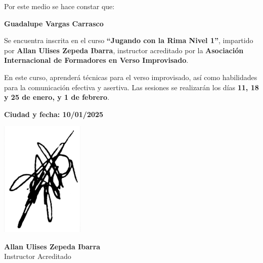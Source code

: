 \documentclass[landscape,letterpaper]{article}
\begin{document}
\noindent Por este medio se hace constar que:

\vspace{0.5cm}

\begin{center}
    {\large \textbf{Guadalupe Vargas Carrasco}}
\end{center}

\vspace{0.5cm}

\noindent Se encuentra inscrita en el curso \textbf{``Jugando con la Rima Nivel 1''}, impartido por \textbf{Allan Ulises Zepeda Ibarra}, instructor acreditado por la \textbf{Asociación Internacional de Formadores en Verso Improvisado}.

\vspace{0.5cm}

\noindent En este curso, aprenderá técnicas para el verso improvisado, así como habilidades para la comunicación efectiva y asertiva. Las sesiones se realizarán los días \textbf{11, 18 y 25 de enero, y 1 de febrero}.

\vspace{1cm}

\noindent \textbf{Ciudad y fecha: 10/01/2025} 

\vspace{1.5cm}

\noindent \begin{minipage}[t]{0.2\textwidth}
  \includegraphics[width=0.3\textwidth]{FIRMA.png} %
    
    \textbf{Allan Ulises Zepeda Ibarra} \\
    Instructor Acreditado
\end{minipage}
\end{document}
